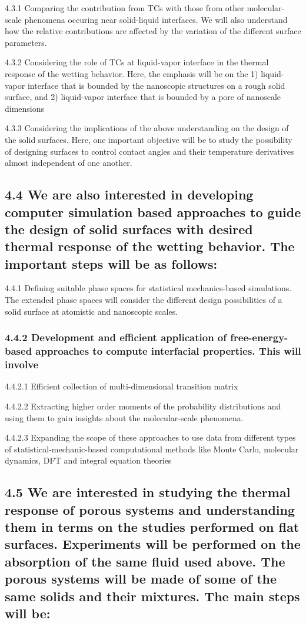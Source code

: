 \par 4.3.1 Comparing the contribution from TCs with those from other molecular-scale phenomena occuring near solid-liquid interfaces. We will also understand how the relative contributions are affected by the variation of the different surface parameters.
\par 4.3.2 Considering the role of TCs at liquid-vapor interface in the thermal response of the wetting behavior. Here, the emphasis will be on the 1) liquid-vapor interface that is bounded by the nanoscopic structures on a rough solid surface, and 2) liquid-vapor interface that is bounded by a pore of nanoscale dimensions
\par 4.3.3 Considering the implications of the above understanding on the design of the solid surfaces. Here, one important objective will be to study the possibility of designing surfaces to control contact angles and their temperature derivatives almost independent of one another.\subsection{4.4 We are also interested in developing computer simulation based approaches to guide the design of solid surfaces with desired thermal response of the wetting behavior. The important steps will be as follows:}

\par 4.4.1 Defining suitable phase spaces for statistical mechanics-based simulations. The extended phase spaces will consider the different design possibilities of a solid surface at atomistic and nanoscopic scales.\subsubsection{4.4.2 Development and efficient application of free-energy-based approaches to compute interfacial properties. This will involve}

\par 4.4.2.1 Efficient collection of multi-dimensional transition matrix
\par 4.4.2.2 Extracting higher order moments of the probability distributions and using them to gain insights about the molecular-scale phenomena.
\par 4.4.2.3 Expanding the scope of these approaches to use data from different types of statistical-mechanic-based computational methods like Monte Carlo, molecular dynamics, DFT and integral equation theories\subsection{4.5 We are interested in studying the thermal response of porous systems and understanding them in terms on the studies performed on flat surfaces. Experiments will be performed on the absorption of the same fluid used above. The porous systems will be made of some of the same solids and their mixtures. The main steps will be:}

